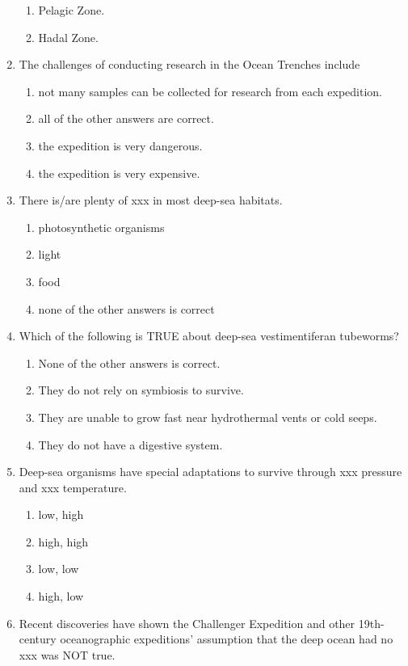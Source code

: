 \documentclass{report}
\begin{document}
\begin{enumerate}
\begin{enumerate}
        \item   Pelagic Zone. 
        \item   Hadal Zone. 
    \end{enumerate}
    \item The challenges of conducting research in the Ocean Trenches include
    \begin{enumerate}
        \item   not many samples can be collected for research from each expedition. 
        \item   all of the other answers are correct. 
        \item   the expedition is very dangerous. 
        \item   the expedition is very expensive. 
    \end{enumerate}
    \item There is/are plenty of xxx in most deep-sea habitats.
    \begin{enumerate}
        \item   photosynthetic organisms 
        \item   light 
        \item   food 
        \item   none of the other answers is correct 
    \end{enumerate}
    \item Which of the following is TRUE about deep-sea vestimentiferan tubeworms?
    \begin{enumerate}
        \item   None of the other answers is correct. 
        \item   They do not rely on symbiosis to survive. 
        \item   They are unable to grow fast near hydrothermal vents or cold seeps. 
        \item   They do not have a digestive system. 
    \end{enumerate}
    \item Deep-sea organisms have special adaptations to survive through xxx pressure and xxx temperature.
    \begin{enumerate}
        \item   low, high 
        \item   high, high 
        \item   low, low 
        \item   high, low 
    \end{enumerate}
    \item Recent discoveries have shown the Challenger Expedition and other 19th-century oceanographic expeditions' assumption that the deep ocean had no xxx  was NOT true. 

\end{enumerate}
\end{document}
